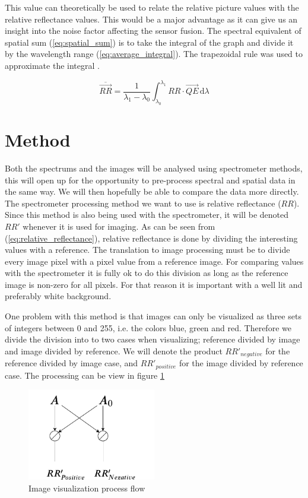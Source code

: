 \documentclass{article}
\newcommand*\mean[1]{\overline{#1}}
\begin{document}
This value can theoretically be used to relate the relative picture values with the relative reflectance values. This would be a major advantage as it can give us an insight into the noise factor affecting the sensor fusion.  
The spectral equivalent of spatial sum (\ref{eq:spatial_sum}) is to take the integral of the graph and divide it by the wavelength range (\ref{eq:average_integral}). The trapezoidal rule was used to approximate the integral \cite{TrapezoidRuleMathematical}. 

\begin{equation}
    \label{eq:average_integral}
    \mean{\vec{RR}} = \frac{1}{\lambda_1 - \lambda_0} \int_{\lambda_0}^{\lambda_1} RR \cdot \vec{QE} \,\mathrm{d}\lambda 
\end{equation}

\section{Method}
Both the spectrums and the images will be analysed using spectrometer methods, this will open up for the opportunity to pre-process spectral and spatial data in the same way. We will then hopefully be able to compare the data more directly. The spectrometer processing method we want to use is relative reflectance ($RR$). Since this method is also being used with the spectrometer, it will be denoted $RR'$ whenever it is used for imaging. As can be seen from (\ref{eq:relative_reflectance}), relative reflectance is done by dividing the interesting values with a reference. The translation to image processing must be to divide every image pixel with a pixel value from a reference image. For comparing values with the spectrometer it is fully ok to do this division as long as the reference image is non-zero for all pixels. For that reason it is important with a well lit and preferably white background. 


One problem with this method is that images can only be visualized as three sets of integers between 0 and 255, i.e. the colors blue, green and red. Therefore we divide the division into to two cases when visualizing; reference divided by image and image divided by reference. We will denote the product $RR'_{negative}$ for the reference divided by image case, and $RR'_{positive}$ for the image divided by reference case. The processing can be view in figure \ref{fig:image_visualization_program_flow} 

\begin{figure}[h]
    \centering
    \includegraphics[width=0.5\textwidth]{figures/image_program_flow.pdf}
    \caption{Image visualization process flow}
    \label{fig:image_visualization_program_flow}
\end{figure}
\end{document}
